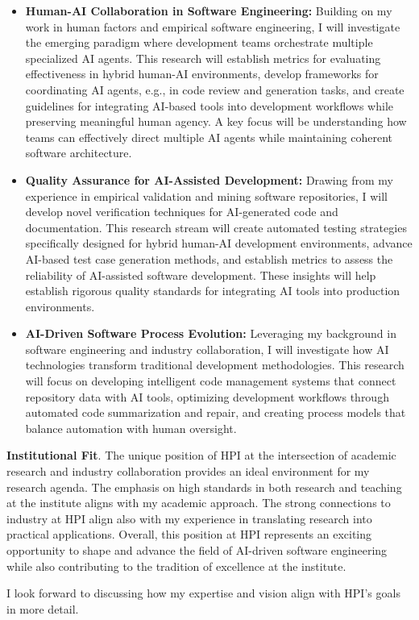 \begin{itemize}
\item \textbf{Human-AI Collaboration in Software Engineering:} Building on my work in human factors and empirical software engineering, I will investigate the emerging paradigm where development teams orchestrate multiple specialized AI agents. This research will establish metrics for evaluating effectiveness in hybrid human-AI environments, develop frameworks for coordinating AI agents, e.g., in code review and generation tasks, and create guidelines for integrating AI-based tools into development workflows while preserving meaningful human agency. A key focus will be understanding how teams can effectively direct multiple AI agents while maintaining coherent software architecture.
\item \textbf{Quality Assurance for AI-Assisted Development:} Drawing from my experience in empirical validation and mining software repositories, I will develop novel verification techniques for AI-generated code and documentation. This research stream will create automated testing strategies specifically designed for hybrid human-AI development environments, advance AI-based test case generation methods, and establish metrics to assess the reliability of AI-assisted software development. These insights will help establish rigorous quality standards for integrating AI tools into production environments.
\item \textbf{AI-Driven Software Process Evolution:} Leveraging my background in software engineering and industry collaboration, I will investigate how AI technologies transform traditional development methodologies. This research will focus on developing intelligent code management systems that connect repository data with AI tools, optimizing development workflows through automated code summarization and repair, and creating process models that balance automation with human oversight.
\end{itemize}

\textbf{Institutional Fit}. 
The unique position of HPI at the intersection of academic research and industry collaboration provides an ideal environment for my research agenda. 
The emphasis on high standards in both research and teaching at the institute aligns with my academic approach.
The strong connections to industry at HPI align also with my experience in translating research into practical applications. 
Overall, this position at HPI represents an exciting opportunity to shape and advance the field of AI-driven software engineering while also contributing to the tradition of excellence at the institute.

I look forward to discussing how my expertise and vision align with HPI's goals in more detail.